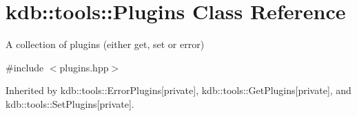 \hypertarget{classkdb_1_1tools_1_1Plugins}{\section{kdb\-:\-:tools\-:\-:Plugins Class Reference}
\label{classkdb_1_1tools_1_1Plugins}
}


A collection of plugins (either get, set or error)  




{\ttfamily \#include $<$plugins.\-hpp$>$}



Inherited by kdb\-::tools\-::\-Error\-Plugins{\ttfamily  \mbox{[}private\mbox{]}}, kdb\-::tools\-::\-Get\-Plugins{\ttfamily  \mbox{[}private\mbox{]}}, and kdb\-::tools\-::\-Set\-Plugins{\ttfamily  \mbox{[}private\mbox{]}}.

